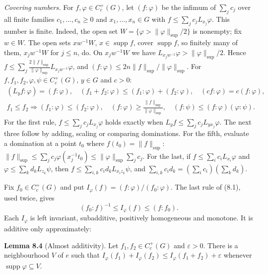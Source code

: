 \documentclass[
  english,
  11pt,
  a4paper,
]{article}
\newcounter{none} %
\begin{document}
\emph{Covering numbers.} For \(f,\varphi\in C_c^+(G)\), let
\((f:\varphi)\) be the infimum of \(\sum_jc_j\) over all finite families
\(c_1,\dots,c_n\geq0\) and \(x_1,\dots,x_n\in G\) with
\(f\leq\sum_jc_jL_{x_j}\varphi\). This number is finite. Indeed, the
open set \(W=\{\varphi>\|\varphi\|_{\sup}/2\}\) is nonempty; fix
\(w\in W\). The open sets \(xw^{-1}W\), \(x\in\operatorname{supp}f\),
cover \(\operatorname{supp}f\), so finitely many of them, \(x_jw^{-1}W\)
for \(j\leq n\), do. On \(x_jw^{-1}W\) we have
\(L_{x_jw^{-1}}\varphi>\|\varphi\|_{\sup}/2\). Hence
\(f\leq\sum_j\frac{2\|f\|_{\sup}}{\|\varphi\|_{\sup}}L_{x_jw^{-1}}\varphi\),
and \((f:\varphi)\leq2n\|f\|_{\sup}/\|\varphi\|_{\sup}\). For
\(f,f_1,f_2,\varphi,\psi\in C_c^+(G)\), \(y\in G\) and \(c>0\):
\[\begin{gathered}
(L_yf:\varphi)=(f:\varphi),\quad (f_1+f_2:\varphi)\leq(f_1:\varphi)+(f_2:\varphi),\quad (cf:\varphi)=c(f:\varphi),\\
f_1\leq f_2\Rightarrow(f_1:\varphi)\leq(f_2:\varphi),\quad (f:\varphi)\geq\frac{\|f\|_{\sup}}{\|\varphi\|_{\sup}},\quad (f:\psi)\leq(f:\varphi)(\varphi:\psi).
\end{gathered}
\tag{8.1}\] For the first rule, \(f\leq\sum_jc_jL_{x_j}\varphi\) holds
exactly when \(L_yf\leq\sum_jc_jL_{yx_j}\varphi\). The next three follow
by adding, scaling or comparing dominations. For the fifth, evaluate a
domination at a point \(t_0\) where \(f(t_0)=\|f\|_{\sup}\):
\(\|f\|_{\sup}\leq\sum_jc_j\varphi(x_j^{-1}t_0)\leq\|\varphi\|_{\sup}\sum_jc_j\).
For the last, if \(f\leq\sum_ic_iL_{x_i}\varphi\) and
\(\varphi\leq\sum_kd_kL_{z_k}\psi\), then
\(f\leq\sum_{i,k}c_id_kL_{x_iz_k}\psi\), and
\(\sum_{i,k}c_id_k=(\sum_ic_i)(\sum_kd_k)\).

Fix \(f_0\in C_c^+(G)\) and put
\(I_\varphi(f)=(f:\varphi)/(f_0:\varphi)\). The last rule of (8.1), used
twice, gives \[(f_0:f)^{-1}\leq I_\varphi(f)\leq(f:f_0).
\tag{8.2}\] Each \(I_\varphi\) is left invariant, subadditive,
positively homogeneous and monotone. It is additive only approximately:

\textbf{Lemma 8.4} (Almost additivity). Let \(f_1,f_2\in C_c^+(G)\) and
\(\varepsilon>0\). There is a neighbourhood \(V\) of \(e\) such that
\(I_\varphi(f_1)+I_\varphi(f_2)\leq I_\varphi(f_1+f_2)+\varepsilon\)
whenever \(\operatorname{supp}\varphi\subseteq V\).
\end{document}
